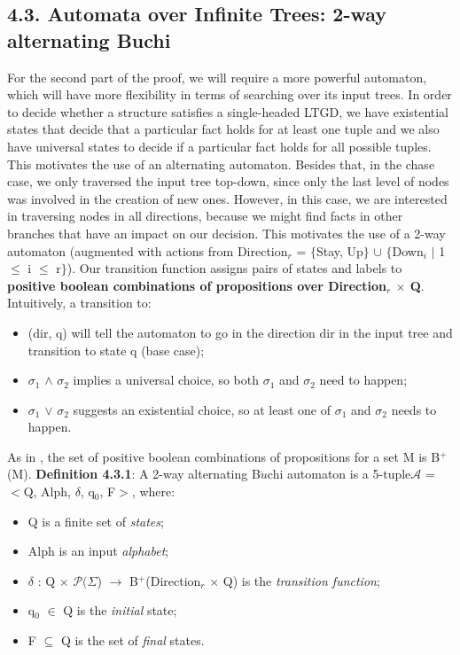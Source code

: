 \documentclass[11pt, a4paper, dvipsnames]{article}
\begin{document}
\subsection{4.3. Automata over Infinite Trees: 2-way alternating Buchi}
For the second part of the proof, we will require a more powerful automaton, which will have more flexibility in terms of searching over its input trees. \newline
In order to decide whether a structure satisfies a single-headed LTGD, we have existential states that decide that a particular fact holds for at least one tuple and we also have universal states to decide if a particular fact holds for all possible tuples. This motivates the use of an alternating automaton.\newline
Besides that, in the chase case, we only traversed the input tree top-down, since only the last level of nodes was involved in the creation of new ones. However, in this case, we are interested in traversing nodes in all directions, because we might find facts in other branches that have an impact on our decision. This motivates the use of a 2-way automaton (augmented with actions from Direction$_{r}$ = $\{$Stay, Up$\}$ $\cup$ $\{$Down$_{i}$ $|$ 1 $\leq$ i $\leq$ r$\}$). \newline
Our transition function assigns pairs of states and labels to \textbf{positive boolean combinations of propositions over Direction$_{r}$ $\times$ Q}. Intuitively, a transition to:
\begin{itemize}
	\item (dir, q) will tell the automaton to go in the direction dir in the input tree and transition to state q (base case);
	\item $\sigma_{1}$ $\wedge$ $\sigma_{2}$ implies a universal choice, so both $\sigma_{1}$ and $\sigma_{2}$ need to happen;
	\item  $\sigma_{1}$ $\vee$ $\sigma_{2}$ suggests an existential choice, so at least one of $\sigma_{1}$ and $\sigma_{2}$ needs to happen.
\end{itemize}
As in \cite{decidable}, the set of positive boolean combinations of propositions for a set M is B$^{+}$(M).\newline
\textbf{Definition 4.3.1}: A 2-way alternating B$\ddot{u}$chi automaton is a 5-tuple\newline $\mathcal{A}$ = $<$Q, Alph, $\delta$, q$_{0}$, F$>$, where:
\begin{itemize}
	\item Q is a finite set of \textit{states};
	\item Alph is an input \textit{alphabet};
	\item $\delta$ : Q $\times$ $\mathcal{P}(\Sigma$) $\rightarrow$ B$^{+}$(Direction$_{r}$ $\times$ Q) is the \textit{transition function};
	\item q$_{0}$ $\in$ Q is the \textit{initial} state;
	\item F $\subseteq$ Q is the set of \textit{final} states.
\end{itemize}
\end{document}
